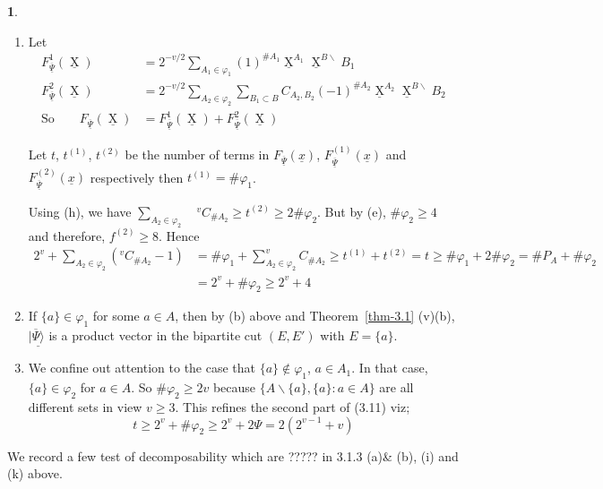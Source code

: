 \documentclass[a4paper,12pt]{article}
\DeclareMathOperator{\x}{\mathrm{X}}
\theoremstyle{definition}
\theoremstyle{underlinethm}
\theoremstyle{underline}
\newtheorem{subsubsec}{}[subsection]
\begin{document}
\begin{subsubsec}
\begin{enumerate}[label=(\alph*)]
\item Let 
\begin{align*}
F^{1}_{\underline{\overline{\Psi}}}(\underline{\x})  &= 2^{-v/2} \sum_{A_{1} \in \varphi_{1}}(1)^{\# A_{1}} \underline{\x}^{A_{1}} \underline{\x}^{B\smallsetminus} B_{1}\\
F^{2}_{\underline{\overline{\Psi}}}(\underline{\x})  &= 2^{-v/2} \sum_{A_{2} \in \varphi_{2}} \sum_{B_{1} \subset B} C_{A_{2}, B_{2}}(-1)^{\# A_{2}} \underline{\x}^{A_{2}} \underline{\x}^{B\smallsetminus}B_{2}\tag{3.10}\\
\text{So}\quad\quad F_{\underline{\overline{\Psi}}} (\underline{\x}) &= F^{1}_{\underline{\overline{\Psi}}} (\underline{\x}) + F^{2}_{\underline{\overline{\Psi}}} (\underline{\x})
\end{align*}

Let $t$, $t^{(1)}$, $t^{(2)}$ be the number of terms in $F_{\underline{\overline{\Psi}}}(\underline{x})$, $F^{(1)}_{\underline{\overline{\Psi}}}(\underline{x})$ and $F^{(2)}_{\underline{\overline{\Psi}}}(\underline{x})$ respectively then $t^{(1)} = \# \varphi_{1}$.

Using (h), we have $\sum_{A_{2} \in \varphi_{2}} \quad ^{v}C_{\# A_{2}} \geq t^{(2)} \geq 2 \# \varphi_{2}$. But by (e), $\# \varphi_{2} \geq 4$  and therefore, $f^{(2)} \geq 8$. Hence 
\begin{align*}
2^ {v} + \sum_{A_{2} \in \varphi_{2}}(^{v}C_{\# A_{2}}-1) &= \# \varphi_{1} + \sum_{A_{2} \in \varphi_{2}} ^{v}C_{\# A_{2}} \geq t^{(1)} + t^{(2)} = t \geq \# \varphi_{1} + 2 \# \varphi_{2} = \#P_{A} + \# \varphi_{2}\\
& = 2^{v} + \# \varphi_{2} \geq 2^{v} + 4 \tag{3.11}  
\end{align*}

\item If $\{a\} \in \varphi_{1}$ for some $a\in A$, then by (b) above and Theorem~\ref{thm-3.1} (v)(b), $|\underline{\overline{\Psi} \rangle}$ is a product vector in the bipartite cut $(E, E')$ with $E= \{a\}$.

\item We confine out attention to the case that $\{a\} \notin \varphi_{1}$, $a\in A_{1}$. In that case, $\{a\} \in \varphi_{2}$ for $a\in A$. So $\# \varphi_{2} \geq 2v$ because $\{A \smallsetminus \{a\}, \{a\} : a \in A \}$ are all different sets in view $v \geq 3$. This refines the second part of (3.11) viz; 
\begin{equation*}
t \geq 2^{v} + \# \varphi_{2} \geq 2^{v} + 2 \Psi = 2(2^{v-1} + v)\tag{3.12} 
\end{equation*} 

\end{enumerate}

We record a few test of decomposability which are ????? in 3.1.3 (a)\& (b), (i) and (k) above.

\end{subsubsec}
\end{document}
